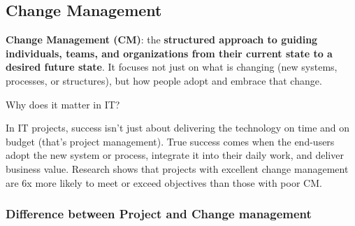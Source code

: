 \subsection{Change Management}

\indent 

\noindent \textbf{Change Management (CM)}: the \textbf{structured approach to guiding individuals, teams, and organizations from their current state to a desired future state}. It focuses not just on what is changing (new systems, processes, or structures), but how people adopt and embrace that change.

\bigskip

\noindent Why does it matter in IT?

In IT projects, success isn’t just about delivering the technology on time and on budget (that’s project management). True success comes when the end-users adopt the new system or process, integrate it into their daily work, and deliver business value. Research shows that projects with excellent change management are 6x more likely to meet or exceed objectives than those with poor CM.

\subsubsection{Difference between Project and Change management}

